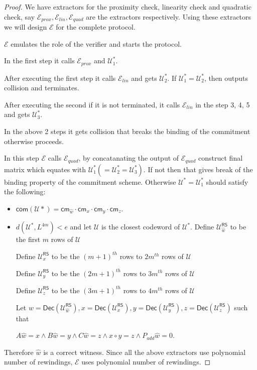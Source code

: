 \documentclass[runningheads]{llncs}
\def\extrac{\mathcal{E}} %
\def\RS{\mathsf{RS}} %
\def\cm{\mathsf{cm}} %
\def\com{\mathsf{com}} %
\def\extwit{\hat{w}} %
\def\oracle{\mathcal{U}^{\RS}}
\def\dec{\mathsf{Dec}}
\def\calU{\mathcal{U}}
\begin{document}
	\begin{proof}
		We have extractors for the proximity check, linearity check and quadratic check, say $\extrac_{prox}, \extrac_{lin}, \extrac_{quad}$ are the extractors respectively. Using these extractors we will design  $\extrac$ for the complete protocol. 
		
		$\extrac$ emulates the role of the verifier and starts the protocol. 
		
		In the first step it calls $\extrac_{prox}$ and $\calU_1^*$.
		
		After executing the first step it calls $\extrac_{lin}$ and gets $\calU_2^*$. If $\calU_1^* = \calU_2^*$, then outputs collision and terminates.
		
		After executing the second if it is not terminated, it calls $\extrac_{lin}$ in the step 3, 4, 5 and gets $\calU_3^*$. 
		
		In the above 2 steps it gets collision that breaks the binding of the commitment otherwise proceeds.
		
		In this step $\extrac$ calls $\extrac_{quad}$, by concatanating the output of $\extrac_{quad}$ construct final matrix which equates with $\calU_1^* (=\calU_2^*=\calU_3^*)$. If not then that gives break of the binding property of the commitment scheme. Otherwise $\calU^*=\calU_1^*$ should satisfy the following:
		\begin{itemize}
			\item $\com(\calU*)=\cm_{\extwit}\cdot\cm_x\cdot\cm_y\cdot\cm_z$.
			\item $d(\calU^*,L^{4m}) < e$ and let $\calU$ is the closest codeword of $\calU^*$. Define $\oracle_{\extwit}$ to be the first $m$ rows of $\calU$
			
			Define $\oracle_{x}$ to be the $(m+1)^{th}$ rows to $2m^{th}$ rows of $\calU$
			
			Define $\oracle_{y}$ to be the $(2m+1)^{th}$ rows to $3m^{th}$ rows of $\calU$
			
			Define $\oracle_{z}$ to be the $(3m+1)^{th}$ rows to $4m^{th}$ rows of $\calU$
			
			Let $w= \dec(\oracle_{\extwit}), x=\dec(\oracle_x), y=\dec(\oracle_y), z=\dec(\oracle_z)$ such that
			
			$A\extwit = x \wedge B \extwit = y \wedge C \extwit = z \wedge x\circ y =z \wedge P_{add} \extwit = 0$.
		\end{itemize}
		Therefore $\extwit$ is a correct witness. Since all the above extractors use polynomial number of rewindings, $\extrac$ uses polynomial number of rewindings.		
	\end{proof}
\end{document}
